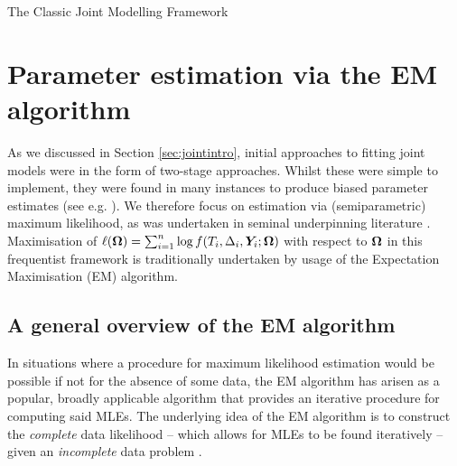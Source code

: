 \begin{chapter}{\label{cha:methods-classic}The Classic Joint Modelling Framework}
\section{\label{sec:methods-estimation-EM}Parameter estimation via the EM algorithm}
As we discussed in Section \ref{sec:jointintro}, initial approaches to fitting joint models were in the form of two-stage approaches. Whilst these were simple to implement, they were found in many instances to produce biased parameter estimates (see e.g. \citet{Sweeting2011}). We therefore focus on estimation via (semiparametric) maximum likelihood, as was undertaken in seminal underpinning literature \citep{Wulfsohn97, Henderson2000}. Maximisation of $\ell(\bm{\mathrm{\Omega}})=\sum_{i=1}^n\log f\!\left( T_i, \Delta_i, \bm{Y}_i; \bm{\mathrm{\Omega}}\right)$ with respect to $\bm{\mathrm{\Omega}}$ in this frequentist framework is traditionally undertaken by usage of the Expectation Maximisation (EM) algorithm.
\subsection{\label{sec:methods-em-general}A general overview of the EM algorithm}
  In situations where a procedure for maximum likelihood estimation would be possible if not for the absence of some data, the EM algorithm has arisen as a popular, broadly applicable algorithm that provides an iterative procedure for computing said MLEs. The underlying idea of the EM algorithm is to construct the \textit{complete} data likelihood -- which allows for MLEs to be found iteratively -- given an \textit{incomplete} data problem \citep{Mclachlan08}.
  

\end{chapter}
